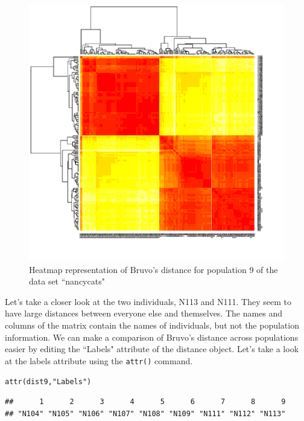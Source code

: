 \documentclass[letterpaper]{article}\usepackage[]{graphicx}\usepackage[]{color}
\makeatletter
\newcommand{\hlstr}[1]{\textcolor[rgb]{0.651,0.522,0}{#1}}%
\newcommand{\hlstd}[1]{\textcolor[rgb]{0,0,0}{#1}}%
\newcommand{\hlkwd}[1]{\textcolor[rgb]{0,0.267,0.4}{#1}}%
\newenvironment{kframe}{%
 \def\at@end@of@kframe{}%
 \ifinner\ifhmode%
  \def\at@end@of@kframe{\end{minipage}}%
  \begin{minipage}{\columnwidth}%
 \fi\fi%
 \def\FrameCommand##1{\hskip\@totalleftmargin \hskip-\fboxsep
 \colorbox{shadecolor}{##1}\hskip-\fboxsep
     \hskip-\linewidth \hskip-\@totalleftmargin \hskip\columnwidth}%
 \MakeFramed {\advance\hsize-\width
   \@totalleftmargin\z@ \linewidth\hsize
   \@setminipage}}%
 {\par\unskip\endMakeFramed%
 \at@end@of@kframe}
\newenvironment{knitrout}{}{} %
\makeatother
\begin{document}
\begin{figure}[h!]
  \centering
  \caption{\footnotesize Heatmap representation of Bruvo's distance for population 9 of the data set ``nancycats"}
  \label{bruvo_heat_map}
\begin{knitrout}\footnotesize
{}\color{fgcolor}

{\centering \includegraphics[width=0.5\linewidth]{figure/unnamed-chunk-8} 

}



\end{knitrout}

\end{figure}

Let's take a closer look at the two individuals, N113 and N111. They seem to have large distances between everyone else and themselves. The names and columns of the matrix contain the names of individuals, but not the population information. We can make a comparison of Bruvo's distance across populations easier by editing the ``Labels" attribute of the distance object. Let's take a look at the labels attribute using the \texttt{attr()} command. 
\begin{knitrout}\footnotesize
{}\color{fgcolor}\begin{kframe}
\begin{alltt}
\hlkwd{attr}\hlstd{(dist9,} \hlstr{"Labels"}\hlstd{)}
\end{alltt}
\begin{verbatim}
##      1      2      3      4      5      6      7      8      9 
## "N104" "N105" "N106" "N107" "N108" "N109" "N111" "N112" "N113"
\end{verbatim}
\end{kframe}
\end{knitrout}
\end{document}
